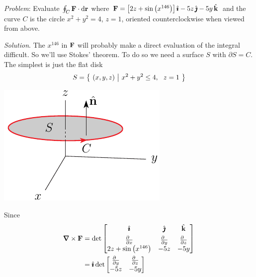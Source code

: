 \begin{eg}\label{eg:stokesAA}
\noindent\textit{Problem}:
Evaluate
$
\oint_C\mathbf{F}\cdot\mathrm{d}\mathbf{r}
$
where $\mathbf{F}= \big[2z+\sin\big(x^{146}\big)\big]\,\hat{\pmb{\imath}}-5z\,\hat{\pmb{\jmath}} -5y\,\hat{\mathbf{k}}$ 
and the curve $C$ is the circle $x^2+y^2=4$, $z=1$, 
oriented counterclockwise when viewed from above.

\medskip
\noindent\textit{Solution}. 
The $x^{146}$ in $\mathbf{F}$ will probably make a direct evaluation of the
integral difficult. So we'll use Stokes' theorem. To do so we need
a surface $S$ with $\partial S=C$. The simplest is just the flat
disk
\begin{equation*}
S = \big\{ \ (x,y,z)\ \big|\  x^2+y^2\le 4,\ \ z=1\ \big\}
\end{equation*}
\begin{nfig}
\begin{center}
    \includegraphics{horizontalDiskB.pdf}
\end{center}
\end{nfig}
Since
\begin{align*}
\vnabla\times\vF & = \det\left[\begin{matrix}
                         \hi & \hj & \hk \\[0.05in]
                         \frac{\partial\hfill}{\partial x} &
                         \frac{\partial\hfill}{\partial y} &
                         \frac{\partial\hfill}{\partial z} \\
                              2z+\sin\big(x^{146}\big)  &  -5z  & -5y
                               \end{matrix}\right] \\
& =\hi \det\left[\begin{matrix}
                         \frac{\partial\hfill}{\partial y} &
                         \frac{\partial\hfill}{\partial z} \\
                               -5z  & -5y
                               \end{matrix}\right] 

\end{align*}
\end{eg}
